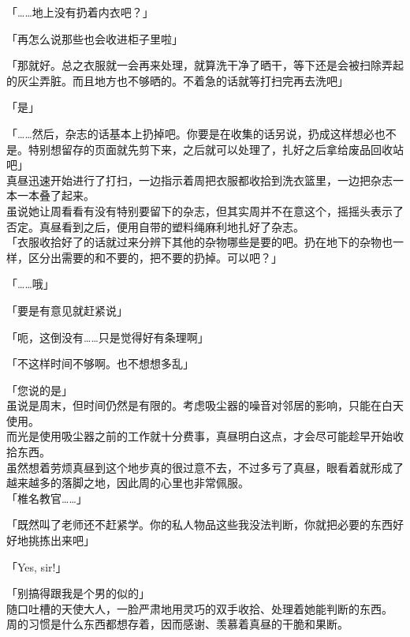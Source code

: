 「……地上没有扔着内衣吧？」

「再怎么说那些也会收进柜子里啦」

「那就好。总之衣服就一会再来处理，就算洗干净了晒干，等下还是会被扫除弄起的灰尘弄脏。而且地方也不够晒的。不着急的话就等打扫完再去洗吧」

「是」

「……然后，杂志的话基本上扔掉吧。你要是在收集的话另说，扔成这样想必也不是。特别想留存的页面就先剪下来，之后就可以处理了，扎好之后拿给废品回收站吧」\\

真昼迅速开始进行了打扫，一边指示着周把衣服都收拾到洗衣篮里，一边把杂志一本一本叠了起来。\\

虽说她让周看看有没有特别要留下的杂志，但其实周并不在意这个，摇摇头表示了否定。真昼看到之后，便用自带的塑料绳麻利地扎好了杂志。\\

「衣服收拾好了的话就过来分辨下其他的杂物哪些是要的吧。扔在地下的杂物也一样，区分出需要的和不要的，把不要的扔掉。可以吧？」

「……哦」

「要是有意见就赶紧说」

「呃，这倒没有……只是觉得好有条理啊」

「不这样时间不够啊。也不想想多乱」

「您说的是」\\

虽说是周末，但时间仍然是有限的。考虑吸尘器的噪音对邻居的影响，只能在白天使用。\\

而光是使用吸尘器之前的工作就十分费事，真昼明白这点，才会尽可能趁早开始收拾东西。\\

虽然想着劳烦真昼到这个地步真的很过意不去，不过多亏了真昼，眼看着就形成了越来越多的落脚之地，因此周的心里也非常佩服。\\

「椎名教官……」

「既然叫了老师还不赶紧学。你的私人物品这些我没法判断，你就把必要的东西好好地挑拣出来吧」

「Yes, sir!」

「别搞得跟我是个男的似的」\\

随口吐槽的天使大人，一脸严肃地用灵巧的双手收拾、处理着她能判断的东西。\\

周的习惯是什么东西都想存着，因而感谢、羡慕着真昼的干脆和果断。\\

